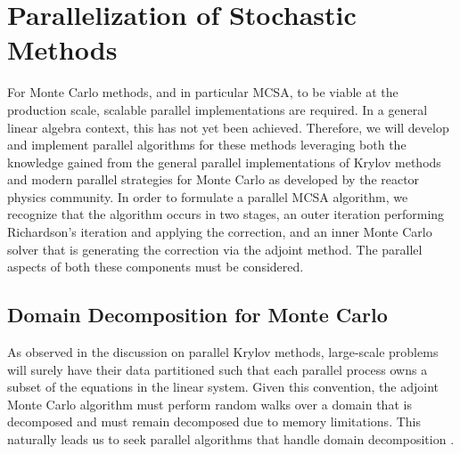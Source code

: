 \section{Parallelization of Stochastic Methods}
\label{sec:parallel_stochastic_methods}
For Monte Carlo methods, and in particular MCSA, to be viable at the
production scale, scalable parallel implementations are required. In a
general linear algebra context, this has not yet been
achieved. Therefore, we will develop and implement parallel algorithms
for these methods leveraging both the knowledge gained from the
general parallel implementations of Krylov methods and modern parallel
strategies for Monte Carlo as developed by the reactor physics
community. In order to formulate a parallel MCSA algorithm, we
recognize that the algorithm occurs in two stages, an outer iteration
performing Richardson's iteration and applying the correction, and an
inner Monte Carlo solver that is generating the correction via the
adjoint method. The parallel aspects of both these components must be
considered.

\subsection{Domain Decomposition for Monte Carlo}
\label{subsec:msod}
As observed in the discussion on parallel Krylov methods, large-scale
problems will surely have their data partitioned such that each
parallel process owns a subset of the equations in the linear
system. Given this convention, the adjoint Monte Carlo algorithm must
perform random walks over a domain that is decomposed and must remain
decomposed due to memory limitations. This naturally leads us to seek
parallel algorithms that handle domain decomposition
\citep{romano_towards_2010}.

